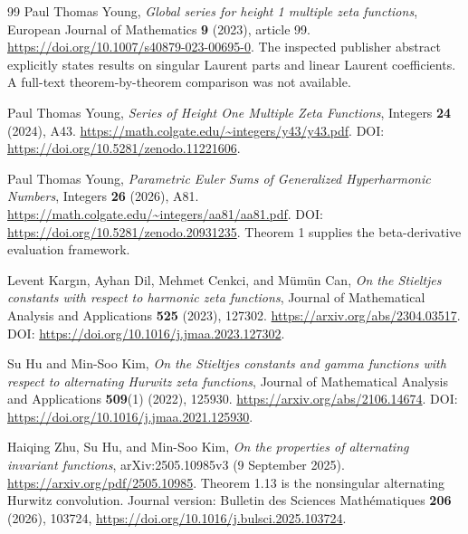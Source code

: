 \begin{thebibliography}{99}
Paul Thomas Young,
\emph{Global series for height 1 multiple zeta functions},
European Journal of Mathematics \textbf{9} (2023), article 99.
\url{https://doi.org/10.1007/s40879-023-00695-0}.
The inspected publisher abstract explicitly states results on singular
Laurent parts and linear Laurent coefficients. A full-text theorem-by-theorem
comparison was not available.

Paul Thomas Young,
\emph{Series of Height One Multiple Zeta Functions},
Integers \textbf{24} (2024), A43.
\url{https://math.colgate.edu/~integers/y43/y43.pdf}.
DOI: \url{https://doi.org/10.5281/zenodo.11221606}.

Paul Thomas Young,
\emph{Parametric Euler Sums of Generalized Hyperharmonic Numbers},
Integers \textbf{26} (2026), A81.
\url{https://math.colgate.edu/~integers/aa81/aa81.pdf}.
DOI: \url{https://doi.org/10.5281/zenodo.20931235}.
Theorem 1 supplies the beta-derivative evaluation framework.

Levent Karg{\i}n, Ayhan Dil, Mehmet Cenkci, and M\"um\"un Can,
\emph{On the Stieltjes constants with respect to harmonic zeta functions},
Journal of Mathematical Analysis and Applications \textbf{525}
(2023), 127302.
\url{https://arxiv.org/abs/2304.03517}.
DOI: \url{https://doi.org/10.1016/j.jmaa.2023.127302}.

Su Hu and Min-Soo Kim,
\emph{On the Stieltjes constants and gamma functions with respect to
alternating Hurwitz zeta functions},
Journal of Mathematical Analysis and Applications \textbf{509}(1)
(2022), 125930.
\url{https://arxiv.org/abs/2106.14674}.
DOI: \url{https://doi.org/10.1016/j.jmaa.2021.125930}.

Haiqing Zhu, Su Hu, and Min-Soo Kim,
\emph{On the properties of alternating invariant functions},
arXiv:2505.10985v3 (9 September 2025).
\url{https://arxiv.org/pdf/2505.10985}.
Theorem 1.13 is the nonsingular alternating Hurwitz convolution.
Journal version: Bulletin des Sciences Math\'ematiques \textbf{206}
(2026), 103724,
\url{https://doi.org/10.1016/j.bulsci.2025.103724}.

\end{thebibliography}

